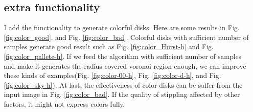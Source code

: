 \documentclass[11pt]{article}
\begin{document}
\subsection{extra functionality}
I add the functionality to generate colorful disks. Here are some results in Fig. \ref{fig:color_good}. and Fig. \ref{fig:color_bad}. Colorful disks with sufficient number of samples generate good result such as Fig. \ref{fig:color_Hurst-h} and Fig. \ref{fig:color_pallete-h}. If we feed the algorithm with sufficient number of samples and make it generates the radius covered voronoi region enough, we can improve these kinds of examples(Fig. \ref{fig:color-00-h}, Fig. \ref{fig:color-d-h}, and Fig. \ref{fig:color_sky-h}). At last, the effectiveness of color disks can be suffer from the input image in Fig. \ref{fig:color_bad}. If the quality of stippling affected by other factors, it might not express colors fully.
\end{document}
